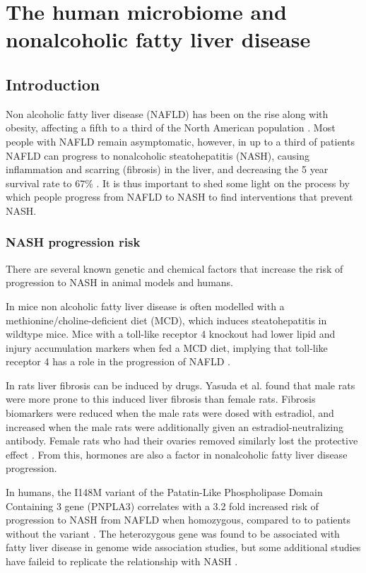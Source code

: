 \chapter{The human microbiome and nonalcoholic fatty liver disease}

\section{Introduction}
Non alcoholic fatty liver disease (NAFLD) has been on the rise along with obesity, affecting a fifth to a third of the North American population \cite{preiss2008non}. Most people with NAFLD remain asymptomatic, however, in up to a third of patients NAFLD can progress to nonalcoholic steatohepatitis (NASH), causing inflammation and scarring (fibrosis) in the liver, and decreasing the 5 year survival rate to 67\% \cite{propst1995prognosis}. It is thus important to shed some light on the process by which people progress from NAFLD to NASH to find interventions that prevent NASH.

\subsection{NASH progression risk}
There are several known genetic and chemical factors that increase the risk of progression to NASH in animal models and humans.

In mice non alcoholic fatty liver disease is often modelled with a methionine/choline-deficient diet (MCD), which induces steatohepatitis in wildtype mice. Mice with a toll-like receptor 4 knockout had lower lipid and injury accumulation markers when fed a MCD diet, implying that toll-like receptor 4 has a role in the progression of NAFLD \cite{rivera2007toll}.

In rats liver fibrosis can be induced by drugs. Yasuda et al. \cite{yasuda1999suppressive} found that male rats were more prone to this induced liver fibrosis than female rats. Fibrosis biomarkers were reduced when the male rats were dosed with estradiol, and increased when the male rats were additionally given an estradiol-neutralizing antibody. Female rats who had their ovaries removed similarly lost the protective effect \cite{yasuda1999suppressive}. From this, hormones are also a factor in nonalcoholic fatty liver disease progression.

In humans, the I148M variant of the Patatin-Like Phospholipase Domain Containing 3 gene (PNPLA3) correlates with a 3.2 fold increased risk of progression to NASH from NAFLD when homozygous, compared to to patients without the variant \cite{sookoian2011meta}. The heterozygous gene was found to be associated with fatty liver disease in genome wide association studies, but some additional studies have faileid to replicate the relationship with NASH \cite{sookoian2011meta}.

